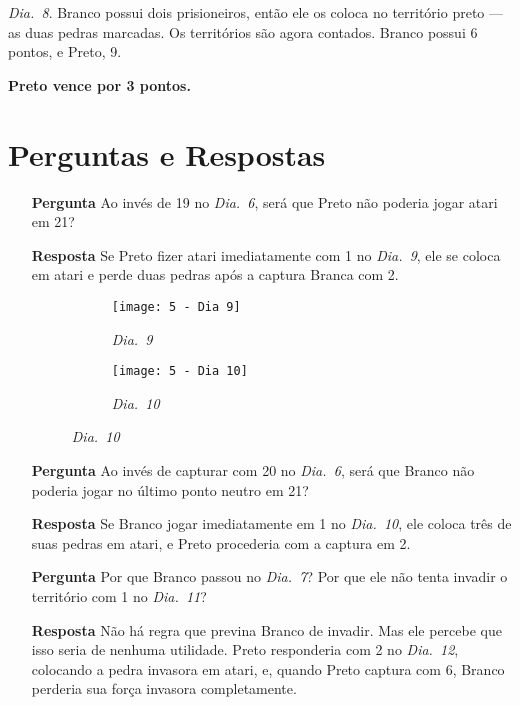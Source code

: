 \emph{Dia.\@~8}. Branco possui dois prisioneiros, então ele os coloca no território preto --- as duas pedras marcadas. Os territórios são agora contados. Branco possui 6 pontos, e Preto, 9.

\textbf{Preto vence por 3 pontos.}

\pagebreak

\section{Perguntas e Respostas}\label{section:5.2:seki}

\begin{itemize}
  \item[\textbf{Pergunta}]
    Ao invés de 19 no \emph{Dia.\@~6}, será que Preto não poderia jogar atari em 21?
  \item[\textbf{Resposta}]
    Se Preto fizer atari imediatamente com 1 no \emph{Dia.\@~9}, ele se coloca em atari e perde duas pedras após a captura Branca com 2.

    \begin{figure}[h!]
      \centering
      \begin{subfigure}[t]{.3\textwidth}
        \centering
        \texttt{[image: 5 - Dia 9]}
        \captionsetup{justification=centering}
        \caption*{\emph{Dia.\@~9}}
      \end{subfigure}
      \hspace{1cm}
      \begin{subfigure}[t]{.3\textwidth}
        \centering
        \texttt{[image: 5 - Dia 10]}
        \captionsetup{justification=centering}
        \caption*{\emph{Dia.\@~10}}
      \end{subfigure}
    \end{figure}

  \item[\textbf{Pergunta}]
    Ao invés de capturar com 20 no \emph{Dia.\@~6}, será que Branco não poderia jogar no último ponto neutro em 21?
  \item[\textbf{Resposta}]
    Se Branco jogar imediatamente em 1 no \emph{Dia.\@~10}, ele coloca três de suas pedras em atari, e Preto procederia com a captura em 2.
  \item[\textbf{Pergunta}]
    Por que Branco passou no \emph{Dia.\@~7}? Por que ele não tenta invadir o território com 1 no \emph{Dia.\@~11}?

  \item[\textbf{Resposta}]
    Não há regra que previna Branco de invadir. Mas ele percebe que isso seria de nenhuma utilidade. Preto responderia com 2 no \emph{Dia.\@~12}, colocando a pedra invasora em atari, e, quando Preto captura com 6, Branco perderia sua força invasora completamente.


\end{itemize}
